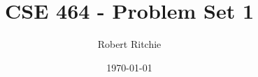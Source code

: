 \documentclass[11pt]{article}
\begin{document}
\author{Robert Ritchie}
\title{CSE 464 - Problem Set 1} 
\date{\today}

\maketitle
\end{document}
